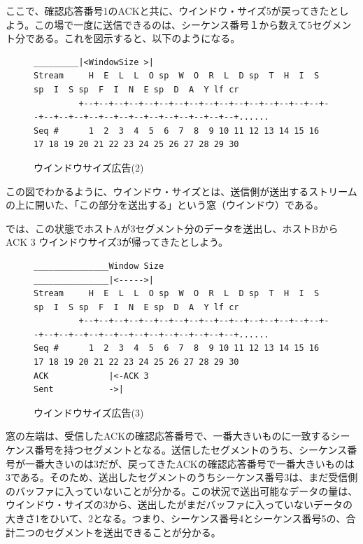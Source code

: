 ここで、確認応答番号1のACKと共に、ウインドウ・サイズ5が戻ってきたとしよう。この場で一度に送信できるのは、シーケンス番号１から数えて5セグメント分である。これを図示すると、以下のようになる。

\begin{figure}[h!] \caption{ウインドウサイズ広告(2)} \label{windowsize2}
\begin{center}
{\scriptsize
\begin{verbatim}
_________|<WindowSize >|      
Stream     H  E  L  L  O sp  W  O  R  L  D sp  T  H  I  S sp  I  S sp  F  I  N  E sp  D  A  Y lf cr              
         +--+--+--+--+--+--+--+--+--+--+--+--+--+--+--+--+--+--+--+--+--+--+--+--+--+--+--+--+--+--+......
Seq #      1  2  3  4  5  6  7  8  9 10 11 12 13 14 15 16 17 18 19 20 21 22 23 24 25 26 27 28 29 30  
\end{verbatim}
}
\end{center}
\end{figure}

この図でわかるように、ウインドウ・サイズとは、送信側が送出するストリームの上に開いた、「この部分を送出する」という窓（ウインドウ）である。

では、この状態でホストAが3セグメント分のデータを送出し、ホストBからACK 3 ウインドウサイズ3が帰ってきたとしよう。

\begin{figure}[h!] \caption{ウインドウサイズ広告(3)} \label{windowsize3}
\begin{center}
{\scriptsize
\begin{verbatim}
_______________Window Size
_______________|<----->|      
Stream     H  E  L  L  O sp  W  O  R  L  D sp  T  H  I  S sp  I  S sp  F  I  N  E sp  D  A  Y lf cr              
         +--+--+--+--+--+--+--+--+--+--+--+--+--+--+--+--+--+--+--+--+--+--+--+--+--+--+--+--+--+--+......
Seq #      1  2  3  4  5  6  7  8  9 10 11 12 13 14 15 16 17 18 19 20 21 22 23 24 25 26 27 28 29 30
ACK            |<-ACK 3  
Sent           ->|
\end{verbatim}
}
\end{center}
\end{figure}

窓の左端は、受信したACKの確認応答番号で、一番大きいものに一致するシーケンス番号を持つセグメントとなる。送信したセグメントのうち、シーケンス番号が一番大きいのは3だが、戻ってきたACKの確認応答番号で一番大きいものは3である。そのため、送出したセグメントのうちシーケンス番号3は、まだ受信側のバッファに入っていないことが分かる。この状況で送出可能なデータの量は、ウインドウ・サイズの3から、送出したがまだバッファに入っていないデータの大きさ1をひいて、2となる。つまり、シーケンス番号4とシーケンス番号5の、合計二つのセグメントを送出できることが分かる。

